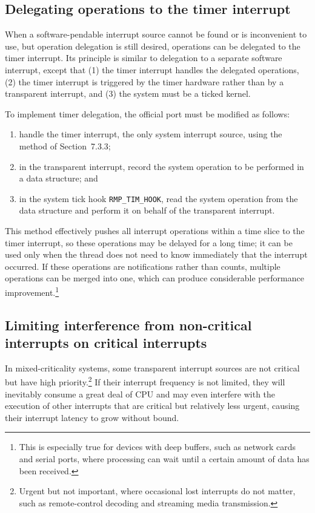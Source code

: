 \subsection{Delegating operations to the timer interrupt}

When a software-pendable interrupt source cannot be found or is inconvenient to use, but operation delegation is still desired, operations can be delegated to the timer interrupt.
Its principle is similar to delegation to a separate software interrupt, except that (1) the timer interrupt handles the delegated operations, (2) the timer interrupt is triggered by the timer hardware rather than by a transparent interrupt, and (3) the system must be a ticked kernel.

To implement timer delegation, the official port must be modified as follows:

\begin{enumerate}
    \item handle the timer interrupt, the only system interrupt source, using the method of Section~7.3.3;
    \item in the transparent interrupt, record the system operation to be performed in a data structure; and
    \item in the system tick hook \texttt{RMP\_TIM\_HOOK}, read the system operation from the data structure and perform it on behalf of the transparent interrupt.
\end{enumerate}

This method effectively pushes all interrupt operations within a time slice to the timer interrupt, so these operations may be delayed for a long time; it can be used only when the thread does not need to know immediately that the interrupt occurred.
If these operations are notifications rather than counts, multiple operations can be merged into one, which can produce considerable performance improvement.\footnote{This is especially true for devices with deep buffers, such as network cards and serial ports, where processing can wait until a certain amount of data has been received.}

\subsection{Limiting interference from non-critical interrupts on critical interrupts}

In mixed-criticality systems, some transparent interrupt sources are not critical but have high priority.\footnote{Urgent but not important, where occasional lost interrupts do not matter, such as remote-control decoding and streaming media transmission.}
If their interrupt frequency is not limited, they will inevitably consume a great deal of CPU and may even interfere with the execution of other interrupts that are critical but relatively less urgent, causing their interrupt latency to grow without bound.

